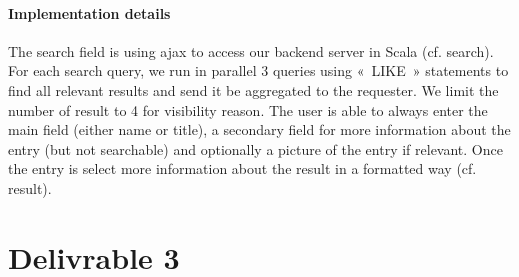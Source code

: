 \documentclass[doubleside, titlepage]{article}
\begin{document}
\subsection{Implementation details}

The search field is using ajax to access our backend server in Scala (cf. search). For each search query, we run in parallel 3 queries using « LIKE » statements to find all relevant results and send it be aggregated to the requester. We limit the number of result to 4 for visibility reason. The user is able to always enter the main field (either name or title), a secondary field for more information about the entry (but not searchable) and optionally a picture of the entry if relevant. Once the entry is select more information about the result in a formatted way (cf. result).

\newpage
\part{Delivrable 3}
\end{document}
